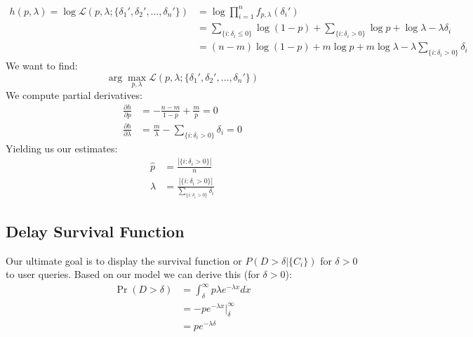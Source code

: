 \documentclass{article}
\begin{document}
\begin{align*}
  h(p, \lambda) = \log\mathcal{L}(p, \lambda ; \{\delta_1', \delta_2', \ldots, \delta_n'\}) &= \log \prod_{i=1}^n f_{p, \lambda}(\delta_i') \\
  &= \sum_{\{i: \delta_i \leq 0\}} \log (1 - p) + \sum_{\{i: \delta_i > 0\}} \log p + \log \lambda - \lambda \delta_i \\
  &= (n - m)\log(1 - p) + m\log p + m\log \lambda - \lambda \sum_{\{i : \delta_i > 0\}} \delta_i
\end{align*}
We want to find:
$$\arg \max_{p, \lambda} \mathcal{L}(p, \lambda ; \{\delta_1', \delta_2', \ldots, \delta_n'\})$$
We compute partial derivatives:
\begin{align*}
  \frac{\partial h}{\partial p} &= -\frac{n - m}{1 - p} + \frac{m}{p} = 0 \\
  \frac{\partial h}{\partial \lambda} &= \frac{m}{\lambda} - \sum_{\{i : \delta_i > 0\}} \delta_i = 0
\end{align*}
Yielding us our estimates:
\begin{align*}
  \hat{p} &= \frac{|\{i: \delta_i > 0\}|}{n} \\
  \hat{\lambda} &= \frac{|\{i: \delta_i > 0\}|}{\sum_{\{i : \delta_i > 0\}} \delta_i}
\end{align*}

\subsection{Delay Survival Function}
Our ultimate goal is to display the survival function or $P(D > \delta | \{C_i\})$ for $\delta > 0$ to user queries. Based on our model we can derive this (for $\delta > 0$):
\begin{align*}
  \Pr(D > \delta) &= \int_\delta^\infty p\lambda e^{-\lambda x}dx \\
  &= -pe^{-\lambda x}\bigg|_\delta^\infty \\
  &= pe^{-\lambda \delta}
\end{align*}
\end{document}
